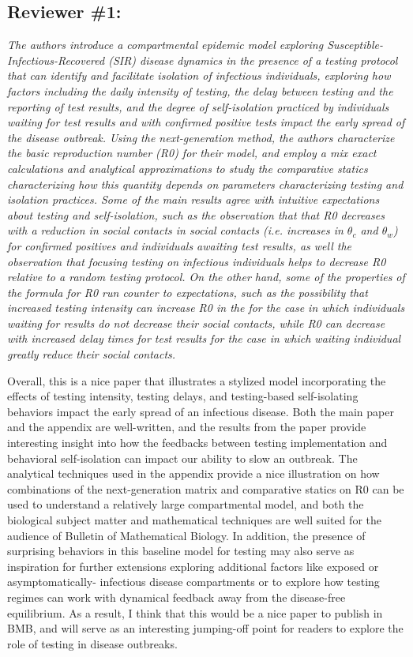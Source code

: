 \documentclass[12pt]{article}
\DeclareRobustCommand\_{\ifmmode\expandafter\subtxt\else\textunderscore\fi}
\begin{document}
\subsection*{ Reviewer \#1:} 
{\it The authors introduce a compartmental epidemic model exploring Susceptible-Infectious-Recovered (SIR) disease dynamics in the presence of a testing protocol that can identify and facilitate isolation of infectious individuals, exploring how factors including the daily intensity of testing, the delay between testing and the reporting of test results, and the degree of self-isolation practiced by individuals waiting for test results and with confirmed positive tests impact the early spread of the disease outbreak. Using the next-generation method, the authors characterize the basic reproduction number (R0) for their model, and employ a mix exact calculations and analytical approximations to study the comparative statics characterizing how this quantity depends on parameters characterizing testing and isolation practices. Some of the main results agree with intuitive expectations about testing and self-isolation, such as the observation that that R0 decreases with a reduction in social contacts in social contacts (i.e. increases in $\theta_c$ and $\theta_w$) for confirmed positives and individuals awaiting test results, as well the observation that focusing testing on infectious individuals helps to decrease R0 relative to a random testing protocol. On the other hand, some of the properties of the formula for R0 run counter to expectations, such as the possibility that increased testing intensity can increase R0 in the for the case in which individuals waiting for results do not decrease their social contacts, while R0 can decrease with increased delay times for test results for the case in which waiting individual greatly reduce their social contacts.

Overall, this is a nice paper that illustrates a stylized model incorporating the effects of testing intensity, testing delays, and testing-based self-isolating behaviors impact the early spread of an infectious disease. Both the main paper and the appendix are well-written, and the results from the paper provide interesting insight into how the feedbacks between testing implementation and behavioral self-isolation can impact our ability to slow an outbreak. The analytical techniques used in the appendix provide a nice illustration on how combinations of the next-generation matrix and comparative statics on R0 can be used to understand a relatively large compartmental model, and both the biological subject matter and mathematical techniques are well suited for the audience of Bulletin of Mathematical Biology. In addition, the presence of surprising behaviors in this baseline model for testing may also serve as inspiration for further extensions exploring additional factors like exposed or asymptomatically- infectious disease compartments or to explore how testing regimes can work with dynamical feedback away from the disease-free equilibrium. As a result, I think that this would be a nice paper to publish in BMB, and will serve as an interesting jumping-off point for readers to explore the role of testing in disease outbreaks.

}
\end{document}
